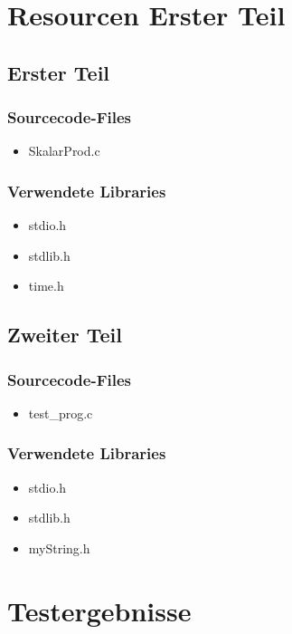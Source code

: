 \documentclass{scrartcl}
\begin{document}
\section{Resourcen Erster Teil}
\subsection{Erster Teil}
\subsubsection{Sourcecode-Files}
\begin{itemize}
\item SkalarProd.c
\end{itemize}

\subsubsection{Verwendete Libraries}
\begin{itemize}
\item stdio.h
\item stdlib.h
\item time.h
\end{itemize}

\subsection{Zweiter Teil}
\subsubsection{Sourcecode-Files}
\begin{itemize}
\item test\_prog.c
\end{itemize}

\subsubsection{Verwendete Libraries}
\begin{itemize}
\item stdio.h
\item stdlib.h
\item myString.h
\end{itemize}

\section{Testergebnisse}
\end{document}
